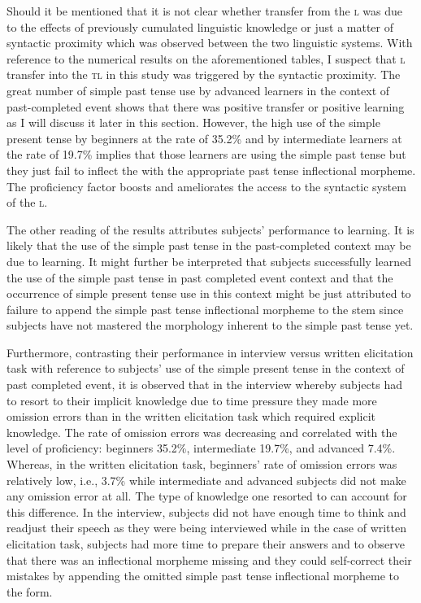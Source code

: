 \documentclass[output=paper,
modfonts
]{langscibook}
\begin{document}
Should it be mentioned that it is not clear whether transfer from the \textsc{l} was due to the effects of previously cumulated linguistic knowledge or just a matter of syntactic proximity which was observed between the two linguistic systems. With reference to the numerical results on the aforementioned tables, I suspect that \textsc{l} transfer into the \textsc{tl} in this study was triggered by the syntactic proximity. The great number of simple past tense use by advanced learners in the context of past-completed event shows that there was positive transfer or positive learning as I will discuss it later in this section. However, the high use of the simple present tense by beginners at the rate of 35.2\% and by intermediate learners at the rate of 19.7\% implies that those learners are using the simple past tense but they just fail to inflect the  with the appropriate past tense inflectional morpheme. The proficiency factor boosts and ameliorates the access to the syntactic system of the \textsc{l}.

\newpage 
The other reading of the results attributes subjects’ performance to learning. It is likely that the use of the simple past tense in the past-completed context may be due to learning. It might further be interpreted that subjects successfully learned the use of the simple past tense in past completed event context and that the occurrence of simple present tense use in this context might be just attributed to failure to append the simple past tense inflectional morpheme to the  stem since subjects have not mastered the morphology inherent to the simple past tense yet. 

Furthermore, contrasting their performance in interview versus written elicitation task with reference to subjects’ use of the simple present tense in the context of past completed event, it is observed that in the interview whereby subjects had to resort to their implicit knowledge due to time pressure they made more omission errors than in the written elicitation task which required explicit knowledge. The rate of omission errors was decreasing and correlated with the level of proficiency: beginners 35.2\%, intermediate 19.7\%, and advanced 7.4\%. Whereas, in the written elicitation task, beginners’ rate of omission errors was relatively low, i.e., 3.7\% while intermediate and advanced subjects did not make any omission error at all. The type of knowledge one resorted to can account for this difference. In the interview, subjects did not have enough time to think and readjust their speech as they were being interviewed while in the case of written elicitation task, subjects had more time to prepare their answers and to observe that there was an inflectional morpheme missing and they could self-correct their mistakes by appending the omitted simple past tense inflectional morpheme to the  form. 
\end{document}
